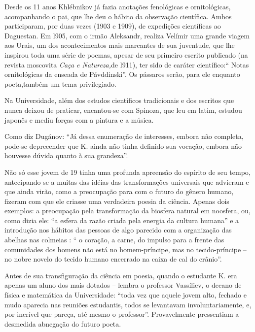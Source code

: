 Desde os 11 anos Khlébnikov já fazia anotações fenológicas e
ornitológicas, acompanhando o pai, que lhe deu o hábito da observação
científica. Ambos participaram, por duas vezes (1903 e 1909), de
expedições científicas ao Daguestan. Em l905, com o irmão Aleksandr,
realiza Velímir uma grande viagem aos Urais, um dos acontecimentos mais
marcantes de sua juventude, que lhe inspirou toda uma série de poemas,
apesar de seu primeiro escrito publicado (na revista moscovita
\emph{Caça e Natureza,}de l911), ter sido de caráter científico:`` Notas
ornitológicas da enseada de Pávddinski''. Os pássaros serão, para ele
enquanto poeta,também um tema privilegiado.

Na Universidade, além dos estudos científicos tradicionais e dos
escritos que nunca deixou de praticar, encantou-se com Spinoza, que leu
em latim, estudou japonês e mediu forças com a pintura e a música.

Como diz Dugánov: ``Já dessa enumeração de interesses, embora não
completa, pode-se depreeender que K. ainda não tinha definido sua
vocação, embora não houvesse dúvida quanto à sua grandeza''.

Não só esse jovem de 19 tinha uma profunda apreensão do espírito de seu
tempo, antecipando-se a muitas das idéias das transformações universais
que advieram e que ainda virão, como a preocupação para com o futuro do
gênero humano, fizeram com que ele criasse uma verdadeira poesia da
ciência. Apenas dois exemplos: a preocupação pela transformação da
biosfera natural em noosfera, ou, como dizia ele: ``a esfera da razão
criada pela energia da cultura humana'' e a introdução nos hábitos das
pessoas de algo parecido com a organização das abelhas nas colmeias : ``
o coração, a carne, do impulso para a frente das comunidades dos homens
não está no homem-príncipe, mas no tecido-príncipe -- no nobre novelo do
tecido humano encerrado na caixa de cal do crânio''.

Antes de sua transfiguração da ciência em poesia, quando o estudante K.
era apenas um aluno dos mais dotados -- lembra o professor Vassíliev, o
decano de física e matemática da Universidade: ``toda vez que aquele
jovem alto, fechado e mudo aparecia nas reuniões estudantis, todos se
levantavam involuntariamente, e, por incrível que pareça, até mesmo o
professor''. Provavelmente pressentiam a desmedida abnegação do futuro
poeta.

